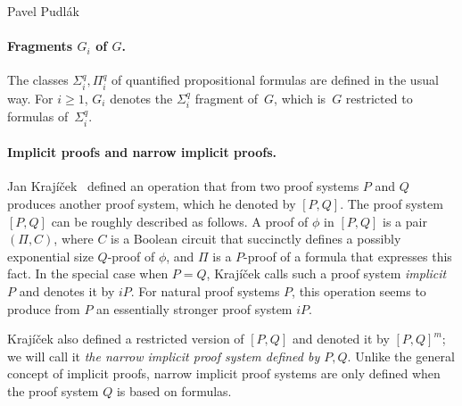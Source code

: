 \documentclass[report]{owrart}
\begin{document}
\begin{report}
\begin{talk}{Pavel Pudl\'ak}
\paragraph{\textbf{Fragments $G_i$ of $G$.}} The classes $\Sigma_i^q,\Pi_i^q$ of quantified propositional formulas are defined in the usual way. 
For $i\geq 1$, $G_i$ denotes the $\Sigma_i^q$ fragment of~$G$, which is~$G$ restricted to formulas of~$\Sigma_i^q$.

\paragraph{\textbf{Implicit proofs and narrow implicit proofs.}}

Jan Kraj\'i\v cek~\cite{krajicek-implicit} defined an operation that from two proof systems $P$ and $Q$ produces another proof system, which he denoted by $[P,Q]$. The proof system $[P,Q]$ can be roughly described as follows. A proof of $\phi$ in $[P,Q]$ is a pair $(\Pi,C)$, where $C$ is a Boolean circuit that succinctly defines a possibly exponential size $Q$-proof of $\phi$, and $\Pi$ is a $P$-proof of a formula that expresses this fact. In the special case when $P=Q$, Kraj\'i\v cek calls such a proof system \emph{implicit $P$} and denotes it by $iP$. For natural proof systems $P$, this operation seems to produce from $P$ an essentially stronger proof system $iP$.

Kraj\'i\v cek also defined a restricted version of $[P,Q]$ and denoted it by $[P,Q]^m$; we will  call it \emph{the narrow implicit proof system defined by $P,Q$}. Unlike the general concept of implicit proofs, narrow implicit proof systems are only defined when the proof system $Q$ is based on formulas.  %


\end{talk}
\end{report}
\end{document}

